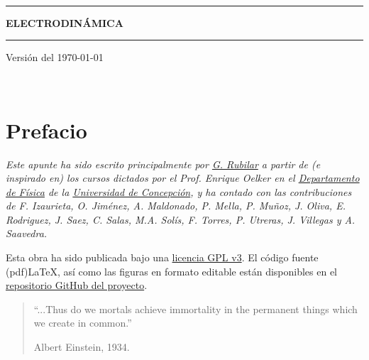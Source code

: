 \documentclass[letterpaper,11pt]{report}
\begin{document}
\sffamily

\thispagestyle{empty}
\begin{center}

\

\vspace{6.5cm}

\rule{15cm}{0.1cm}

\vspace{1.5cm}

{\huge \textsc{\textbf{ELECTRODINÁMICA}}}

\vspace{1.5cm}

\rule{15cm}{0.1cm}

\vspace{1.5cm}

Versión del \today

\end{center}

\newpage
\thispagestyle{empty}
\ \\
\newpage
\setcounter{page}{1}

\pagestyle{plain}
\chapter*{Prefacio}
\bigskip
\bigskip
\bigskip
\bigskip
\bigskip
\bigskip


\emph{Este apunte ha sido escrito principalmente por \href{https://https://gfrubi.github.io/}{G. Rubilar} a partir de (e inspirado en) los cursos dictados por el Prof. Enrique Oelker en el \href{http://www.fisica.udec.cl/}{Departamento de Física} de la \href{www.udec.cl}{Universidad de Concepción}, y ha contado con las contribuciones de F. Izaurieta, O. Jiménez, A. Maldonado, P. Mella, P. Muñoz, J. Oliva, E. Rodriguez, J. Saez, C. Salas, M.A. Solís, F. Torres, P. Utreras, J. Villegas y A. Saavedra.}

\bigskip


\bigskip

Esta obra ha sido publicada bajo una \href{https://github.com/gfrubi/electrodinamica/blob/master/LICENSE}{licencia GPL v3}. El código fuente (pdf)\LaTeX, así como las figuras en formato editable están disponibles en el \href{https://github.com/gfrubi/electrodinamica}{repositorio GitHub del proyecto}.
\bigskip
\bigskip
\bigskip
\bigskip
\bigskip
\bigskip



\begin{quote}
    ``...Thus do we mortals achieve immortality in the permanent things which we create in common.''

    \hfill Albert Einstein, 1934.
\end{quote}
\end{document}
